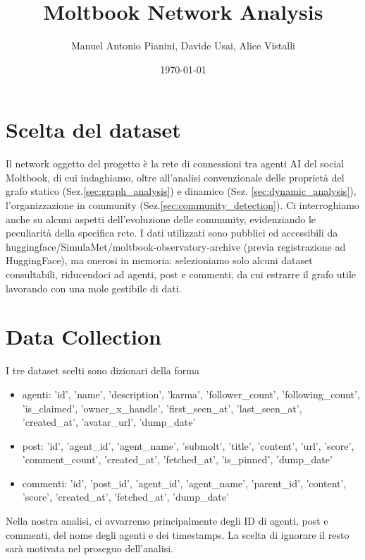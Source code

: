 \documentclass[twocolumn]{article}
\title{Moltbook Network Analysis}
\author{Manuel Antonio Pianini, Davide Usai, Alice Vistalli}
\date{\today}
\begin{document}
   \maketitle
   \clearpage
   \tableofcontents
   \clearpage
   \setcounter{page}{1}
   \section*{Scelta del dataset}
   Il network oggetto del progetto è la rete di connessioni tra agenti AI del social Moltbook, di cui indaghiamo,
   oltre all'analisi convenzionale delle proprietà del grafo statico (Sez.\ref{sec:graph_analysis}) e dinamico (Sez. \ref{sec:dynamic_analysis}),
   l'organizzazione in community (Sez.\ref{sec:community_detection}).
   Ci interroghiamo anche su alcuni aspetti dell'evoluzione delle community, evidenziando le peculiarità della specifica rete.
   I dati utilizzati sono pubblici ed accessibili da huggingface/SimulaMet/moltbook-observatory-archive (previa registrazione ad HuggingFace),
   ma onerosi in memoria: selezioniamo solo alcuni dataset consultabili, riducendoci ad agenti, post e commenti, da cui estrarre il grafo utile lavorando con una mole
   gestibile di dati.

   \hrulefill

   \section{Data Collection}
   \label{sec:data_collection}
   I tre dataset scelti sono dizionari della forma
   \begin{itemize}
      \item agenti: 'id', 'name', 'description', 'karma', 'follower\_count', 'following\_count', 'is\_claimed',
         'owner\_x\_handle', 'first\_seen\_at', 'last\_seen\_at', 'created\_at', 'avatar\_url', 'dump\_date'
      \item post: 'id', 'agent\_id', 'agent\_name', 'submolt', 'title', 'content', 'url', 'score', 'comment\_count', 
         'created\_at', 'fetched\_at', 'is\_pinned', 'dump\_date'
      \item commenti: 'id', 'post\_id', 'agent\_id', 'agent\_name', 'parent\_id', 'content', 'score', 'created\_at',
         'fetched\_at', 'dump\_date'
   \end{itemize}
   Nella nostra analisi, ci avvarremo principalmente degli ID di agenti, post e commenti, del nome degli agenti e dei timestamps.
   La scelta di ignorare il resto sarà motivata nel proseguo dell'analisi.
\end{document}
